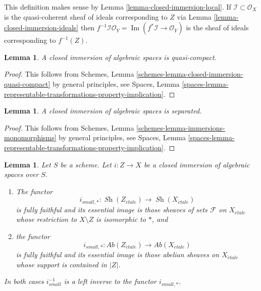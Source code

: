 \documentclass{stacks-project}
\theoremstyle{plain}
\newtheorem{lemma}[subsection]{Lemma}
\theoremstyle{definition}
\theoremstyle{remark}
\numberwithin{equation}{subsection}
\def\Sh{\mathop{\mathit{Sh}}\nolimits}
\def\etale{{\acute{e}tale}}
\def\Im{\mathop{\mathrm{Im}}}
\begin{document}
\noindent
This definition makes sense by Lemma \ref{lemma-closed-immersion-local}.
If $\mathcal{I} \subset \mathcal{O}_X$ is the quasi-coherent sheaf of
ideals corresponding to $Z$ via Lemma \ref{lemma-closed-immersion-ideals} then
$f^{-1}\mathcal{I}\mathcal{O}_Y = \Im(f^*\mathcal{I} \to \mathcal{O}_Y)$
is the sheaf of ideals corresponding to $f^{-1}(Z)$.

\begin{lemma}
\label{lemma-closed-immersion-quasi-compact}
A closed immersion of algebraic spaces is quasi-compact.
\end{lemma}

\begin{proof}
This follows from
Schemes, Lemma \ref{schemes-lemma-closed-immersion-quasi-compact}
by general principles, see
Spaces, Lemma
\ref{spaces-lemma-representable-transformations-property-implication}.
\end{proof}

\begin{lemma}
\label{lemma-closed-immersion-separated}
A closed immersion of algebraic spaces is separated.
\end{lemma}

\begin{proof}
This follows from
Schemes, Lemma \ref{schemes-lemma-immersions-monomorphisms}
by general principles, see
Spaces, Lemma
\ref{spaces-lemma-representable-transformations-property-implication}.
\end{proof}

\begin{lemma}
\label{lemma-closed-immersion-push-pull}
Let $S$ be a scheme. Let $i : Z \to X$ be a closed immersion of algebraic
spaces over $S$.
\begin{enumerate}
\item The functor
$$
i_{small, *} :
\Sh(Z_\etale)
\longrightarrow
\Sh(X_\etale)
$$
is fully faithful and its essential image is those sheaves of sets
$\mathcal{F}$ on $X_\etale$ whose restriction to $X \setminus Z$ is
isomorphic to $*$, and
\item the functor
$$
i_{small, *} :
\textit{Ab}(Z_\etale)
\longrightarrow
\textit{Ab}(X_\etale)
$$
is fully faithful and its essential image is those abelian sheaves on
$X_\etale$ whose support is contained in $|Z|$.
\end{enumerate}
In both cases $i_{small}^{-1}$ is a left inverse to the functor
$i_{small, *}$.
\end{lemma}
\end{document}
